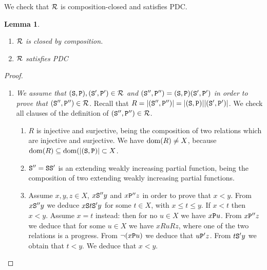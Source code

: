 \documentclass{lmcs}
\newtheorem{lemma}[theorem]{Lemma}
\begin{document}
We check that ${\mathcal R}$ is composition-closed and satisfies PDC.

\begin{lemma}
\label{lemma-composition-closed}
\begin{enumerate}
\item
\label{lemma-composition-closed-01}
${\mathcal R}$ is closed by composition. 

\item
\label{lemma-composition-closed-02}
${\mathcal R}$ satisfies PDC
\end{enumerate}
\end{lemma}

\begin{proof}

\begin{enumerate}
\item
\emph{We assume that $({\tt S},{\tt P}),({\tt S}',{\tt P}') \in {\mathcal R}$ and 
$({\tt S}'',{\tt P}'') = ({\tt S},{\tt P})({\tt S}',{\tt P}')$ in order to prove that 
$({\tt S}'',{\tt P}'')  \in {\mathcal R}$}. Recall that $R = {| ({\tt S}'',{\tt P}'') |} = 
{| ({\tt S},{\tt P}) |} {| ({\tt S}',{\tt P}') |}$. We check all clauses
of the definition of $({\tt S}'',{\tt P}'')  \in {\mathcal R}$.
 
\begin{enumerate}
\item
$R$ is injective and surjective, being the composition of two relations which are injective and surjective. We have ${\rm dom}(R) \not = X$, because 
${\rm dom}(R) \subseteq {\rm dom}({| ({\tt S},{\tt P}) |} \subset X$.

\item
${\tt S}'' = {\tt S}{\tt S}'$ is an extending weakly increasing partial function, being the
composition of two extending weakly increasing partial functions. 

\item
Assume $x,y,z \in X$, $x {\tt S}'' y$ and $x {\tt P}'' z$ in order to prove that $x < y$. 
From $x {\tt S}'' y$ we deduce $x {\tt S} t {\tt S}' y$ for some $t \in X$, with $x \le t \le y$. 
If $x  < t$ then $x < y$. Assume $x = t$ instead:
then for no $u \in X$ we have $x {\tt P} u$. 
From $x {\tt P}'' z$ we deduce that for some $u \in X$ we have $x R u R z$, where one of the
two relations is a progress. From $\neg (x {\tt P} u)$ we deduce that $u {\tt P}' z$. From 
$t {\tt S}' y$ we obtain that $t < y$. We deduce that $x < y$.
\end{enumerate}


\end{enumerate}
\end{proof}
\end{document}
